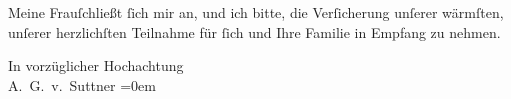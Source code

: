 \pstart
           Meine Frauſchließt{ }ſich mir
               an, und ich bitte, die Verſicherung unſerer wärmſten, unſerer herzlichſten {\pb}Teilnahme für{ }ſich und Ihre Familie in
               Empfang zu nehmen.\pend
           
\pstart
           In vorzüglicher Hochachtung{\\[\baselineskip]}\spacefill\mbox{A. G. v. Suttner}\pend
           \leftskip=0em{}\endnumbering{}  \newcommand{\dateiname}{L00209}\newcommand{\titel}{Arthur von Suttner an Arthur Schnitzler, 3. 5. 1893}\newcommand{\editorInnen}{Martin Anton Müller und Gerd-Hermann Susen}

